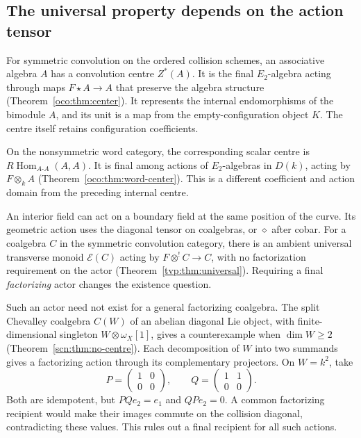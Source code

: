 \subsection{The universal property depends on the action tensor}

For symmetric convolution on the ordered collision
schemes, an associative algebra \(A\) has a convolution
centre \(Z^*(A)\). It is the final \(E_2\)-algebra acting
through maps \(F\star A\to A\) that preserve the algebra
structure (Theorem~\ref{oco:thm:center}). It represents
the internal endomorphisms of the bimodule \(A\), and
its unit is a map from the empty-configuration object
\(K\). The centre itself retains configuration
coefficients.

On the nonsymmetric word category, the corresponding
scalar centre is
\(R\operatorname{Hom}_{A\text{-}A}(A,A)\). It is final
among actions of \(E_2\)-algebras in \(D(k)\), acting
by \(F\otimes_k A\)
(Theorem~\ref{oco:thm:word-center}). This is a different
coefficient and action domain from the preceding internal
centre.

An interior field can act on a boundary field at the
same position of the curve. Its geometric action uses
the diagonal tensor on coalgebras, or \(\diamond\)
after cobar. For a coalgebra \(C\) in the symmetric
convolution category, there is an
ambient universal transverse monoid \(\mathcal E(C)\)
acting by \(F\otimes^!C\to C\), with no factorization
requirement on the actor
(Theorem~\ref{tvp:thm:universal}). Requiring a final
\emph{factorizing} actor changes the existence question.

Such an actor need not exist for a general factorizing
coalgebra. The split Chevalley coalgebra \(C(W)\) of
an abelian diagonal Lie object, with finite-dimensional
singleton \(W\otimes\omega_X[1]\), gives a counterexample
when \(\dim W\geq2\)
(Theorem~\ref{scn:thm:no-centre}). Each decomposition
of \(W\) into two summands gives a factorizing action
through its complementary projectors. On \(W=k^2\),
take
\[
 P=\begin{pmatrix}1&0\\0&0\end{pmatrix},
 \qquad Q=\begin{pmatrix}1&1\\0&0\end{pmatrix}.
\]
Both are idempotent, but \(PQe_2=e_1\) and \(QPe_2=0\).
A common factorizing recipient would make their images
commute on the collision diagonal, contradicting these
values. This rules out a final recipient for all such
actions.

